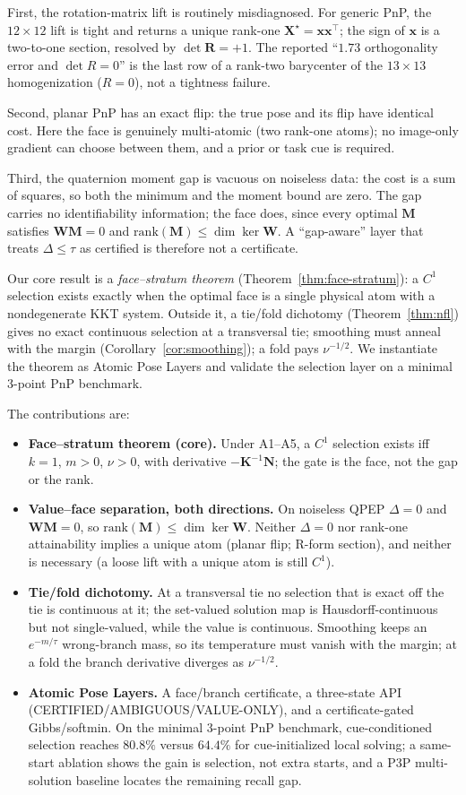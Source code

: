 \documentclass[conference]{IEEEtran}
\newcommand{\bx}{\bm{x}}
\newcommand{\bR}{\bm{R}}
\newcommand{\bK}{\bm{K}}
\newcommand{\bW}{\bm{W}}
\newcommand{\bX}{\bm{X}}
\newcommand{\bM}{\bm{M}}
\newcommand{\bN}{\bm{N}}
\begin{document}
First, the rotation-matrix lift is routinely misdiagnosed. For generic PnP, the $12\times12$ lift is tight and returns a unique rank-one $\bX^\star=\bx\bx^\top$; the sign of $\bx$ is a two-to-one section, resolved by $\det\bR=+1$. The reported ``$1.73$ orthogonality error and $\det R=0$'' is the last row of a rank-two barycenter of the $13\times13$ homogenization ($R=0$), not a tightness failure.

Second, planar PnP has an exact flip: the true pose and its flip have identical cost. Here the face is genuinely multi-atomic (two rank-one atoms); no image-only gradient can choose between them, and a prior or task cue is required.

Third, the quaternion moment gap is vacuous on noiseless data: the cost is a sum of squares, so both the minimum and the moment bound are zero. The gap carries no identifiability information; the face does, since every optimal $\bM$ satisfies $\bW\bM=0$ and $\mathrm{rank}(\bM)\le\dim\ker\bW$. A ``gap-aware'' layer that treats $\Delta\le\tau$ as certified is therefore not a certificate.

Our core result is a \emph{face--stratum theorem} (Theorem~\ref{thm:face-stratum}): a $C^1$ selection exists exactly when the optimal face is a single physical atom with a nondegenerate KKT system. Outside it, a tie/fold dichotomy (Theorem~\ref{thm:nfl}) gives no exact continuous selection at a transversal tie; smoothing must anneal with the margin (Corollary~\ref{cor:smoothing}); a fold pays $\nu^{-1/2}$. We instantiate the theorem as Atomic Pose Layers and validate the selection layer on a minimal 3-point PnP benchmark.

The contributions are:
\begin{itemize}
\item \textbf{Face--stratum theorem (core).} Under A1--A5, a $C^1$ selection exists iff $k=1$, $m>0$, $\nu>0$, with derivative $-\bK^{-1}\bN$; the gate is the face, not the gap or the rank.
\item \textbf{Value--face separation, both directions.} On noiseless QPEP $\Delta=0$ and $\bW\bM=0$, so $\mathrm{rank}(\bM)\le\dim\ker\bW$. Neither $\Delta=0$ nor rank-one attainability implies a unique atom (planar flip; R-form section), and neither is necessary (a loose lift with a unique atom is still $C^1$).
\item \textbf{Tie/fold dichotomy.} At a transversal tie no selection that is exact off the tie is continuous at it; the set-valued solution map is Hausdorff-continuous but not single-valued, while the value is continuous. Smoothing keeps an $e^{-m/\tau}$ wrong-branch mass, so its temperature must vanish with the margin; at a fold the branch derivative diverges as $\nu^{-1/2}$.
\item \textbf{Atomic Pose Layers.} A face/branch certificate, a three-state API (CERTIFIED/AMBIGUOUS/VALUE-ONLY), and a certificate-gated Gibbs/softmin. On the minimal 3-point PnP benchmark, cue-conditioned selection reaches $80.8\%$ versus $64.4\%$ for cue-initialized local solving; a same-start ablation shows the gain is selection, not extra starts, and a P3P multi-solution baseline locates the remaining recall gap.
\end{itemize}
\end{document}
